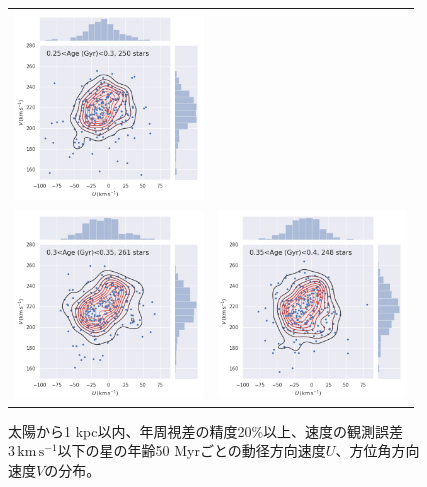 \begin{figure}[htbp]
\begin{tabular}{cc}
\includegraphics[width=5cm]{fig/UV/250to300Myr_z0.1kpc_hist2d.png}\\
\includegraphics[width=5cm]{fig/UV/300to350Myr_z0.1kpc_hist2d.png}&
\includegraphics[width=5cm]{fig/UV/350to400Myr_z0.1kpc_hist2d.png}\\
\end{tabular}
    \caption{太陽から1 kpc以内、年周視差の精度20\%以上、速度の観測誤差$3\,\mathrm{km\,s^{-1}}$以下の星の年齢50 Myrごとの動径方向速度$U$、方位角方向速度$V$の分布。}
    \label{hist_UV_50Myr}
\end{figure}

